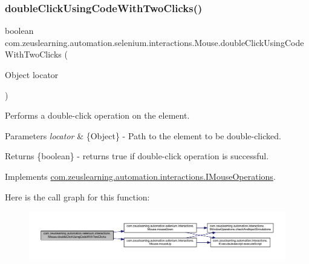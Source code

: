 \subsubsection{\texorpdfstring{double\+Click\+Using\+Code\+With\+Two\+Clicks()}{doubleClickUsingCodeWithTwoClicks()}}
{\footnotesize\ttfamily boolean com.\+zeuslearning.\+automation.\+selenium.\+interactions.\+Mouse.\+double\+Click\+Using\+Code\+With\+Two\+Clicks (\begin{DoxyParamCaption}\item[{Object}]{locator }\end{DoxyParamCaption})\hspace{0.3cm}{\ttfamily [inline]}}

Performs a double-\/click operation on the element.


\begin{DoxyParams}{Parameters}
{\em locator} & \{Object\} -\/ Path to the element to be double-\/clicked. \\
\hline
\end{DoxyParams}
\begin{DoxyReturn}{Returns}
\{boolean\} -\/ returns {\ttfamily true} if double-\/click operation is successful. 
\end{DoxyReturn}


Implements \hyperlink{interfacecom_1_1zeuslearning_1_1automation_1_1interactions_1_1IMouseOperations_af96d9b23c841ba11f4ba19d8c54444ec}{com.\+zeuslearning.\+automation.\+interactions.\+I\+Mouse\+Operations}.

Here is the call graph for this function\+:
\nopagebreak
\begin{figure}[H]
\begin{center}
\leavevmode
\includegraphics[width=350pt]{d0/dfa/classcom_1_1zeuslearning_1_1automation_1_1selenium_1_1interactions_1_1Mouse_a083f651ca67fec159c6992f44019164b_cgraph}
\end{center}
\end{figure}
\hypertarget{classcom_1_1zeuslearning_1_1automation_1_1selenium_1_1interactions_1_1Mouse_a43e7a98c6045351ffbc6eeb5406c8794}{}\label{classcom_1_1zeuslearning_1_1automation_1_1selenium_1_1interactions_1_1Mouse_a43e7a98c6045351ffbc6eeb5406c8794} 
